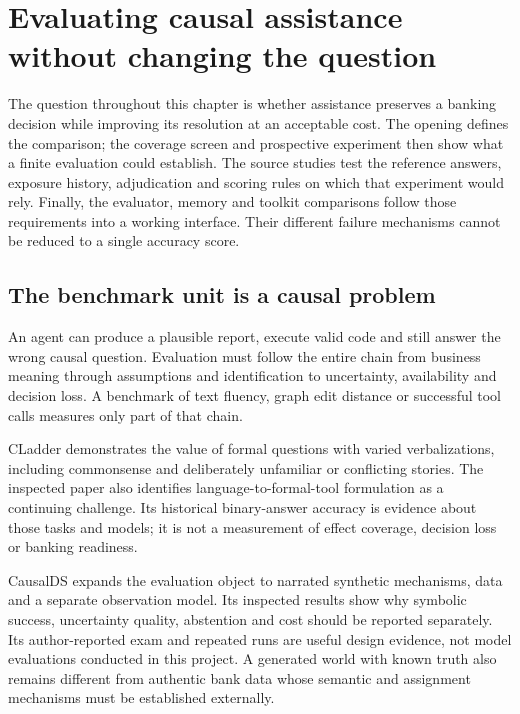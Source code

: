\chapter{Evaluating causal assistance without changing the question}
\label{la:evaluation}

The question throughout this chapter is whether assistance preserves a banking decision while improving its resolution at an acceptable cost. The opening defines the comparison; the coverage screen and prospective experiment then show what a finite evaluation could establish. The source studies test the reference answers, exposure history, adjudication and scoring rules on which that experiment would rely. Finally, the evaluator, memory and toolkit comparisons follow those requirements into a working interface. Their different failure mechanisms cannot be reduced to a single accuracy score.

\section{The benchmark unit is a causal problem}

An agent can produce a plausible report, execute valid code and still answer
the wrong causal question. Evaluation must follow the entire chain from
business meaning through assumptions and identification to uncertainty,
availability and decision loss. A benchmark of text fluency, graph edit
distance or successful tool calls measures only part of that chain.

CLadder demonstrates the value of formal questions with varied verbalizations,
including commonsense and deliberately unfamiliar or conflicting stories.
The inspected paper also identifies language-to-formal-tool formulation as
a continuing challenge. Its historical binary-answer accuracy is evidence
about those tasks and models; it is not a measurement of effect coverage,
decision loss or banking readiness. \citep{v12_la_2312_04350}

CausalDS expands the evaluation object to narrated synthetic mechanisms,
data and a separate observation model. Its inspected results show why
symbolic success, uncertainty quality, abstention and cost should be reported
separately. Its author-reported exam and repeated runs are useful design
evidence, not model evaluations conducted in this project. A generated world
with known truth also remains different from authentic bank data whose
semantic and assignment mechanisms must be established externally.
\citep{v12_la_2607_08093}

